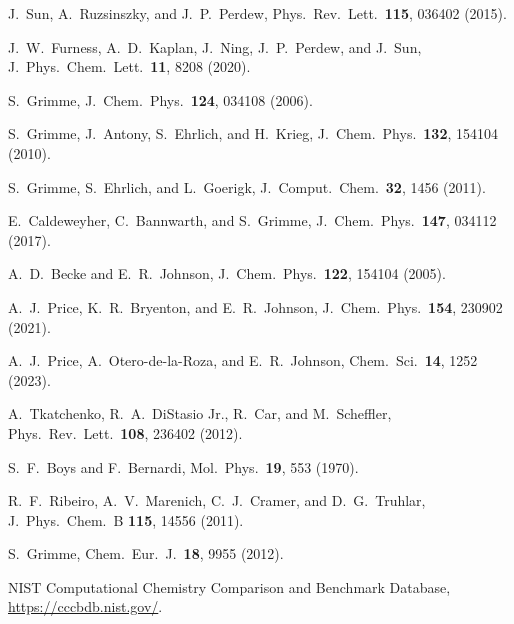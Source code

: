 \documentclass[11pt]{article}
\numberwithin{equation}{section}
\begin{document}
\begin{enumerate}[label={[\arabic*]},leftmargin=*]
 J.\ Sun, A.\ Ruzsinszky, and J.\ P.\ Perdew, Phys.\ Rev.\ Lett.\ \textbf{115}, 036402 (2015).

 J.\ W.\ Furness, A.\ D.\ Kaplan, J.\ Ning, J.\ P.\ Perdew, and J.\ Sun, J.\ Phys.\ Chem.\ Lett.\ \textbf{11}, 8208 (2020).

 S.\ Grimme, J.\ Chem.\ Phys.\ \textbf{124}, 034108 (2006).

 S.\ Grimme, J.\ Antony, S.\ Ehrlich, and H.\ Krieg, J.\ Chem.\ Phys.\ \textbf{132}, 154104 (2010).

 S.\ Grimme, S.\ Ehrlich, and L.\ Goerigk, J.\ Comput.\ Chem.\ \textbf{32}, 1456 (2011).

 E.\ Caldeweyher, C.\ Bannwarth, and S.\ Grimme, J.\ Chem.\ Phys.\ \textbf{147}, 034112 (2017).

 A.\ D.\ Becke and E.\ R.\ Johnson, J.\ Chem.\ Phys.\ \textbf{122}, 154104 (2005).

 A.\ J.\ Price, K.\ R.\ Bryenton, and E.\ R.\ Johnson, J.\ Chem.\ Phys.\ \textbf{154}, 230902 (2021).

 A.\ J.\ Price, A.\ Otero-de-la-Roza, and E.\ R.\ Johnson, Chem.\ Sci.\ \textbf{14}, 1252 (2023).

 A.\ Tkatchenko, R.\ A.\ DiStasio Jr., R.\ Car, and M.\ Scheffler, Phys.\ Rev.\ Lett.\ \textbf{108}, 236402 (2012).

 S.\ F.\ Boys and F.\ Bernardi, Mol.\ Phys.\ \textbf{19}, 553 (1970).

 R.\ F.\ Ribeiro, A.\ V.\ Marenich, C.\ J.\ Cramer, and D.\ G.\ Truhlar, J.\ Phys.\ Chem.\ B \textbf{115}, 14556 (2011).

 S.\ Grimme, Chem.\ Eur.\ J.\ \textbf{18}, 9955 (2012).

 NIST Computational Chemistry Comparison and Benchmark Database, \url{https://cccbdb.nist.gov/}.
\end{enumerate}
\end{document}
